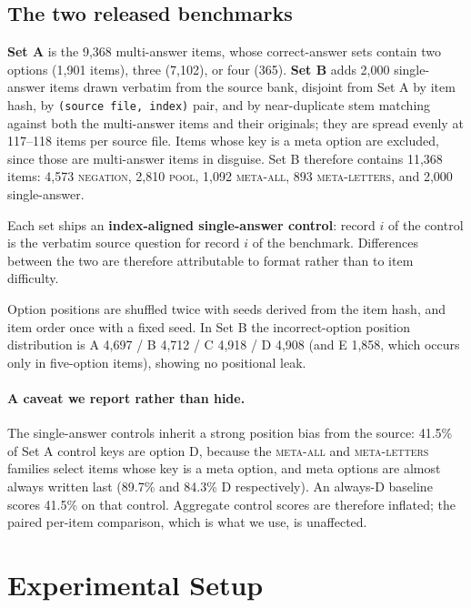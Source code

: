\documentclass{article} %
\begin{document}
\subsection{The two released benchmarks}
\label{sec:sets}

\textbf{Set A} is the 9,368 multi-answer items, whose correct-answer sets contain two
options (1,901 items), three (7,102), or four (365). \textbf{Set B} adds 2,000
single-answer items drawn verbatim from the source bank, disjoint from Set A by item hash,
by \texttt{(source file, index)} pair, and by near-duplicate stem matching against both the
multi-answer items and their originals; they are spread evenly at 117--118 items per source
file. Items whose key is a meta option are excluded, since those are multi-answer items in
disguise. Set B therefore contains 11,368 items: 4,573 \textsc{negation}, 2,810
\textsc{pool}, 1,092 \textsc{meta-all}, 893 \textsc{meta-letters}, and 2,000 single-answer.

Each set ships an \textbf{index-aligned single-answer control}: record $i$ of the control is
the verbatim source question for record $i$ of the benchmark. Differences between the two
are therefore attributable to format rather than to item difficulty.

Option positions are shuffled twice with seeds derived from the item hash, and item order
once with a fixed seed. In Set B the incorrect-option position distribution is
A 4,697 / B 4,712 / C 4,918 / D 4,908 (and E 1,858, which occurs only in five-option
items), showing no positional leak.

\paragraph{A caveat we report rather than hide.} The single-answer controls inherit a
strong position bias from the source: 41.5\% of Set A control keys are option D, because
the \textsc{meta-all} and \textsc{meta-letters} families select items whose key is a meta
option, and meta options are almost always written last (89.7\% and 84.3\% D
respectively). An always-D baseline scores 41.5\% on that control. Aggregate control
scores are therefore inflated; the paired per-item comparison, which is what we use, is
unaffected.

\section{Experimental Setup}
\label{sec:setup}
\end{document}
